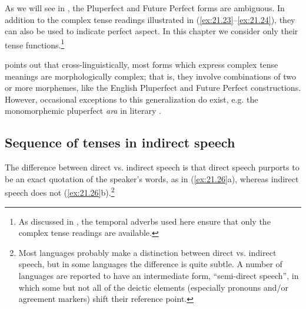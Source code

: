 \ea \label{ex:21.25}
\begin{xlist}
\medskip
{}
\medskip
{}
\end{xlist}
\z


As we will see in , the Pluperfect and Future Perfect forms are ambiguous. In addition to the complex tense readings illustrated in (\ref{ex:21.23}--\ref{ex:21.24}), they can also be used to indicate perfect aspect. In this chapter we consider only their tense functions.\footnote{As discussed in , the temporal adverbs used here ensure that only the complex tense readings are available.}



\citet{Comrie1985} points out that cross-linguistically, most forms which express complex tense meanings are morphologically complex; that is, they involve combinations of two or more morphemes, like the English Pluperfect and Future Perfect constructions. However, occasional exceptions to this generalization do exist, e.g. the monomorphemic pluperfect \textit{ara} in literary .


\subsection{Sequence of tenses in indirect speech}\label{sec:21.4.2}

The difference between direct vs. indirect speech is that direct speech purports to be an exact quotation of the speaker’s words, as in (\ref{ex:21.26}a), whereas indirect speech does not (\ref{ex:21.26}b).\footnote{Most languages probably make a distinction between direct vs. indirect speech, but in some languages the difference is quite subtle. A number of languages are reported to have an intermediate form, “semi-direct speech”, in which some but not all of the deictic elements (especially pronouns and/or agreement markers) shift their reference point.}


